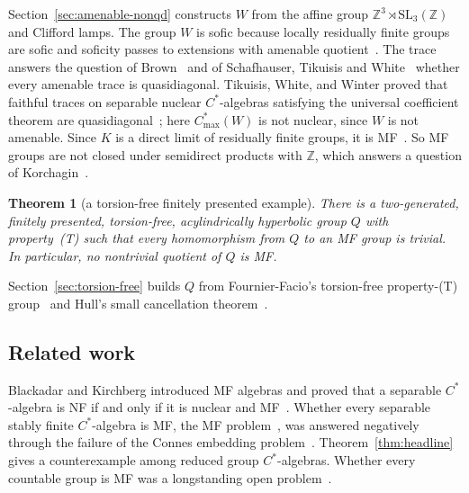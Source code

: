 \documentclass[11pt]{amsart}
\newcommand{\leanverified}[2]{\ignorespaces}
\theoremstyle{plain}
\newtheorem{mainthm}{Theorem}
\begin{document}
Section~\ref{sec:amenable-nonqd} constructs $W$ from the affine group
$\mathbb Z^3\rtimes\mathrm{SL}_3(\mathbb Z)$ and Clifford lamps.  The group
$W$ is sofic because locally residually finite groups are sofic and
soficity passes to extensions with amenable
quotient~\cite[Theorem~1]{ElekSzabo}.  The trace answers the question of
Brown~\cite[discussion preceding Proposition~3.5.1]{Brown} and of
Schafhauser, Tikuisis and White~\cite[Problem~X(1)]{STW} whether every
amenable trace is quasidiagonal.  Tikuisis, White, and Winter proved
that faithful traces on separable nuclear $C^*$-algebras satisfying the
universal coefficient theorem are quasidiagonal~\cite{TWW}; here
$C^*_{\max}(W)$ is not nuclear, since $W$ is not amenable.  Since $K$ is a direct limit of
residually finite groups, it is MF~\cite[Corollary~10 and
Proposition~13]{Korchagin}.  So MF groups are not closed under semidirect
products with $\mathbb Z$, which answers a question of
Korchagin~\cite[remark following Proposition~12]{Korchagin}.

\begin{mainthm}[a torsion-free finitely presented example]
\label{thm:torsion-free}
There is a two-generated, finitely presented, torsion-free, acylindrically
hyperbolic group $Q$ with property~\textup{(T)} such that every
homomorphism from $Q$ to an MF group is trivial.  In particular, no
nontrivial quotient of $Q$ is MF\@.
\end{mainthm}

Section~\ref{sec:torsion-free} builds $Q$ from Fournier-Facio's
torsion-free property-\textup{(T)} group~\cite[\S2]{FFF} and Hull's small
cancellation theorem~\cite{Hull}.

\subsection*{Related work}

Blackadar and Kirchberg introduced MF algebras and proved that a separable
$C^*$-algebra is NF if and only if it is nuclear and MF~\cite{BK}.  Whether
every separable stably finite $C^*$-algebra is MF, the MF
problem~\cite[\S6]{GoldbringHart}, was answered negatively through the
failure of the Connes embedding problem~\cite{MIPRE}\cite[Proposition~6.1
and Remark~6.2]{GoldbringHart}.  Theorem~\ref{thm:headline} gives a
counterexample among reduced group $C^*$-algebras.  Whether every countable
group is MF was a longstanding open problem~\cite{Korchagin,BDL}.
\leanverified{Manuscript/OneSidedMFRadical/ReducedCStarConsequence}{GroupApproximation.Manuscript.OneSidedMFRadical.manuscriptSeparableStablyFiniteNonMFCStarAlgebraExists}
\end{document}
